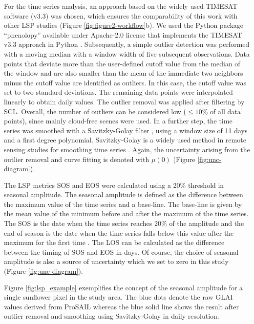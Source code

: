 For the time series analysis, an approach based on the widely used TIMESAT software \citep{eklundh_timesat_2015} (v3.3) was chosen, which ensures the comparability of this work with other \gls{LSP} studies (Figure \ref{fig:figure2-workflow}b). We used the Python package ``phenolopy'' available under Apache-2.0 license that implements the TIMESAT v3.3 approach in Python \citep{trotter_frontiersiphenolopy_2021}. Subsequently, a simple outlier detection was performed with a moving median with a window width of five subsequent observations. Data points that deviate more than the user-defined cutoff value from the median of the window and are also smaller than the mean of the immediate two neighbors minus the cutoff value are identified as outliers. In this case, the cutoff value was set to two standard deviations. The remaining data points were interpolated linearly to obtain daily values. The outlier removal was applied after filtering by SCL. Overall, the number of outliers can be considered low ($\le10$\% of all data points), since mainly cloud-free scenes were used. In a further step, the time series was smoothed with a Savitzky-Golay filter \citep{savitzky_smoothing_1964}, using a window size of 11 days and a first degree polynomial. Savitzky-Golay is a widely used method in remote sensing studies for smoothing time series \citep{chen_simple_2004,zhou_performance_2016,de_castro_mapping_2018}. Again, the uncertainty arising from the outlier removal and curve fitting is denoted with $\mu(0)$ (Figure \ref{fig:unc-diagram}).

The \gls{LSP} metrics \gls{SOS} and \gls{EOS} were calculated using a 20\% threshold in seasonal amplitude. The seasonal amplitude is defined as the difference between the maximum value of the time series and a base-line. The base-line is given by the mean value of the minimum before and after the maximum of the time series. The \gls{SOS} is the date when the time series reaches 20\% of the amplitude and the end of season is the date when the time series falls below this value after the maximum for the first time \citep{jonsson_seasonality_2003, caparros-santiago_land_2021}. The \gls{LOS} can be calculated as the difference between the timing of \gls{SOS} and \gls{EOS} in days. Of course, the choice of seasonal amplitude is also a source of uncertainty which we set to zero in this study (Figure \ref{fig:unc-diagram}).

Figure \ref{fig:lsp_example} exemplifies the concept of the seasonal amplitude for a single sunflower pixel in the study area. The blue dots denote the raw \gls{GLAI} values derived from ProSAIL whereas the blue solid line shows the result after outlier removal and smoothing using Savitzky-Golay in daily resolution.


